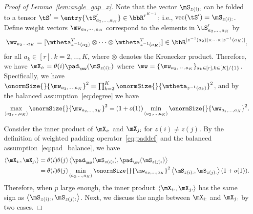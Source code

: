 \documentclass[lettersize,onecolumn,journal]{IEEEtran}
\theoremstyle{definition}
\theoremstyle{definition}
\newcommand{\ang}[1]{\left\langle#1\right\rangle}
\begin{document}
\begin{proof}[Proof of Lemma~\ref{lem:angle_gap_x}] 
Note that the vector $\mS_{z(i):}$ can be folded to a tensor $\tS' =\entry{\tS'_{a_2,\ldots,a_K}} \in \bbR^{r^{K-1}}$; i.e., $\text{vec}(\tS') = \mS_{z(i):}$. Define weight vectors $\mw_{a_2, \cdots, a_K}$ correspond to the elements in $\tS'_{a_2,\ldots,a_K}$ by
\begin{equation}
    \mw_{a_2 \cdots a_K} = [ \mtheta_{z^{-1} (a_2)}^T \otimes \cdots \otimes \mtheta_{z^{-1} (a_K)}^T] \in \bbR^{|z^{-1} (a_2)| \times \cdots \times |z^{-1} (a_K)|},
\end{equation}
for all $a_k \in [r], k = 2,\ldots, K$, where $\otimes$ denotes the Kronecker product. Therefore, we have  $\mX_{i:} = \theta(i) \pad_{\mw}(\mS_{z(i):})$ where $\mw = \{ \mw_{a_2, \cdots, a_K}\}_{a_k \in [r], k\in [K]/\{1\}}$. Specifically, we have $\onormSize{}{\mw_{a_2, \ldots, a_K}}^2 = \prod_{k = 2}^K \onormSize{}{ \mtheta_{z^{-1}(a_k)}}^2$, and by the balanced assumption~\eqref{eq:degree} we have 
\begin{equation}\label{eq:pad_balance}
    \max_{(a_2,\ldots, a_K)} \onormSize{}{\mw_{a_2,\ldots, a_K}}^2 = (1 + o(1))  \min_{(a_2,\ldots, a_K)} \onormSize{}{\mw_{a_2,\ldots, a_K}}^2.
\end{equation}

Consider the inner product of $\mX_{i:}$ and $\mX_{j:}$ for $z(i) \neq z(j)$. By the definition of weighted padding operator~\eqref{eq:paddef} and the balanced assumption~\eqref{eq:pad_balance}, we have 
\begin{align}
    \ang{\mX_{i:},\mX_{j:}} &= \theta(i) \theta(j) \ang{ \pad_{\mw}(\mS_{z(i):}), \pad_{\mw}(\mS_{z(j):} )}\\
    &= \theta(i) \theta(j) \min_{(a_2,\ldots, a_K)} \onormSize{}{\mw_{a_2,\ldots, a_K}}^2 \ang{\mS_{z(i):}, \mS_{z(j):}}(1 + o(1)).
\end{align}
Therefore, when $p$ large enough, the inner product $\ang{\mX_{i:},\mX_{j:}} $ has the same sign as $\ang{\mS_{z(i):}, \mS_{z(j):}}$. Next, we discuss the angle between $\mX_{i:}$ and $\mX_{j:}$ by two cases.


\end{proof}
\end{document}
